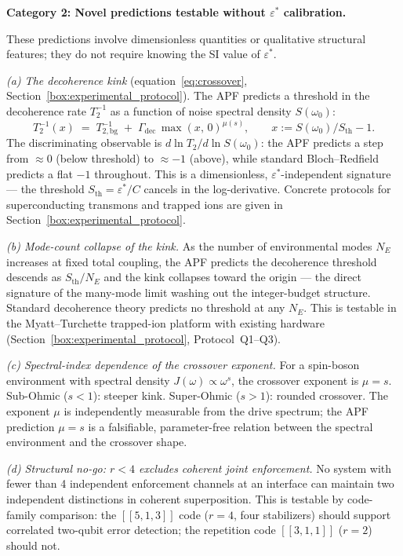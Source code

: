 \documentclass[11pt]{article}
\theoremstyle{remark}
\begin{document}
\medskip\noindent\textbf{Category 2: Novel predictions testable without $\varepsilon^*$ calibration.}

These predictions involve dimensionless quantities or qualitative structural features; they do not require knowing the SI value of $\varepsilon^*$.

\smallskip
\emph{(a) The decoherence kink} (equation~\eqref{eq:crossover}, Section~\ref{box:experimental_protocol}).  The APF predicts a threshold in the decoherence rate $T_2^{-1}$ as a function of noise spectral density $S(\omega_0)$:
\[
T_2^{-1}(x) \;=\; T_{2,\mathrm{bg}}^{-1} \;+\; \Gamma_{\mathrm{dec}}\,\max(x,\,0)^{\mu(s)}, \qquad x := S(\omega_0)/S_{\mathrm{th}} - 1.
\]
The discriminating observable is $d\ln T_2 / d\ln S(\omega_0)$: the APF predicts a step from $\approx 0$ (below threshold) to $\approx -1$ (above), while standard Bloch--Redfield predicts a flat $-1$ throughout.  This is a dimensionless, $\varepsilon^*$-independent signature --- the threshold $S_{\mathrm{th}} = \varepsilon^*/C$ cancels in the log-derivative.  Concrete protocols for superconducting transmons and trapped ions are given in Section~\ref{box:experimental_protocol}.

\smallskip
\emph{(b) Mode-count collapse of the kink.}  As the number of environmental modes $N_E$ increases at fixed total coupling, the APF predicts the decoherence threshold descends as $S_{\mathrm{th}}/N_E$ and the kink collapses toward the origin --- the direct signature of the many-mode limit washing out the integer-budget structure.  Standard decoherence theory predicts no threshold at any $N_E$.  This is testable in the Myatt--Turchette trapped-ion platform with existing hardware (Section~\ref{box:experimental_protocol}, Protocol~Q1--Q3).

\smallskip
\emph{(c) Spectral-index dependence of the crossover exponent.}  For a spin-boson environment with spectral density $J(\omega) \propto \omega^s$, the crossover exponent is $\mu = s$.  Sub-Ohmic ($s < 1$): steeper kink.  Super-Ohmic ($s > 1$): rounded crossover.  The exponent $\mu$ is independently measurable from the drive spectrum; the APF prediction $\mu = s$ is a falsifiable, parameter-free relation between the spectral environment and the crossover shape.

\smallskip
\emph{(d) Structural no-go: $r < 4$ excludes coherent joint enforcement.}  No system with fewer than 4 independent enforcement channels at an interface can maintain two independent distinctions in coherent superposition.  This is testable by code-family comparison: the $[\![5,1,3]\!]$ code ($r = 4$, four stabilizers) should support correlated two-qubit error detection; the repetition code $[\![3,1,1]\!]$ ($r = 2$) should not.
\end{document}
